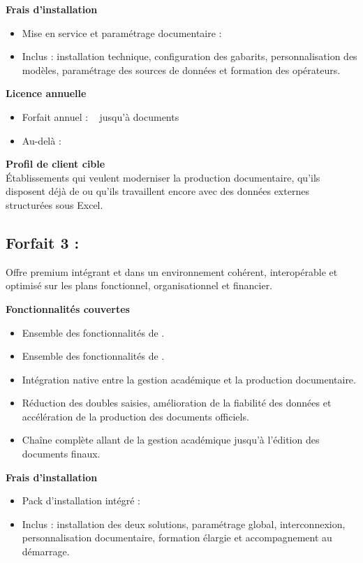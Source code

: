 \documentclass[12pt,a4paper]{article}
\newcommand{\Amount}[1]{#1~\Currency}
\newcommand{\FeatureListStart}{\begin{itemize}[leftmargin=1.2cm,itemsep=0.3em]}
\newcommand{\FeatureListEnd}{\end{itemize}}
\begin{document}
\textbf{Frais d'installation}
\FeatureListStart
    \item Mise en service et paramétrage documentaire : \Amount{\SetupDocument}
    \item Inclus : installation technique, configuration des gabarits, personnalisation des modèles, paramétrage des sources de données et formation des opérateurs.
\FeatureListEnd

\textbf{Licence annuelle}
\FeatureListStart
    \item Forfait annuel : \Amount{\DocumentAnnualBase} jusqu'à \DocumentIncludedVolume{} documents
    \item Au-delà : \Amount{\DocumentExtraPrice}~\PricingPerExtraDocumentLabel
\FeatureListEnd

\textbf{Profil de client cible}\\
Établissements qui veulent moderniser la production documentaire, qu'ils disposent déjà de \AcademicSoftwareName{} ou qu'ils travaillent encore avec des données externes structurées sous Excel.

\subsection{Forfait 3 : \BundleSoftwareName}

\begin{tcolorbox}[colback=SoftGray,colframe=PrimaryBlue,title=Positionnement]
Offre premium intégrant \AcademicSoftwareName{} et \DocumentSoftwareName{} dans un environnement cohérent, interopérable et optimisé sur les plans fonctionnel, organisationnel et financier.
\end{tcolorbox}

\textbf{Fonctionnalités couvertes}
\FeatureListStart
    \item Ensemble des fonctionnalités de \AcademicSoftwareName.
    \item Ensemble des fonctionnalités de \DocumentSoftwareName.
    \item Intégration native entre la gestion académique et la production documentaire.
    \item Réduction des doubles saisies, amélioration de la fiabilité des données et accélération de la production des documents officiels.
    \item Chaîne complète allant de la gestion académique jusqu'à l'édition des documents finaux.
\FeatureListEnd

\textbf{Frais d'installation}
\FeatureListStart
    \item Pack d'installation intégré : \Amount{\SetupBundle}
    \item Inclus : installation des deux solutions, paramétrage global, interconnexion, personnalisation documentaire, formation élargie et accompagnement au démarrage.
\FeatureListEnd
\end{document}
